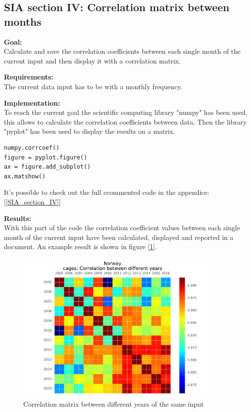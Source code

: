 \newpage
\subsection{SIA section IV: Correlation matrix between months}

\textbf{Goal:}\\
Calculate and save the correlation coefficients between each single month of the current input and then display it with a correlation matrix.

\textbf{Requirements:}\\
The current data input has to be with a monthly frequency. 

\textbf{Implementation:}\\
To reach the current goal the scientific computing library "numpy" has been used, this allows to calculate the correlation coefficients between data. Then the library "pyplot" has been used to display the results on a matrix.

\begin{lstlisting}
numpy.corrcoef()
figure = pyplot.figure()
ax = figure.add_subplot()
ax.matshow()
\end{lstlisting}

It's possible to check out the full ccommented code in the appendice: [\ref{SIA_section_IV}]


\textbf{Results:} \\
With this part of the code the correlation coefficient values between each single month of the current input have been calculated, displayed and reported in a document. An example result is shown in figure [\ref{Corr_Years}].

\begin{figure}[H]
	\centering
    \includegraphics[trim={0 0.3cm 0 0.3cm},clip,width=0.9\textwidth]{Files/Cages_Years_Matrix.pdf}
    \caption{Correlation matrix between different years of the same input}
    \label{Corr_Years}
\end{figure}


